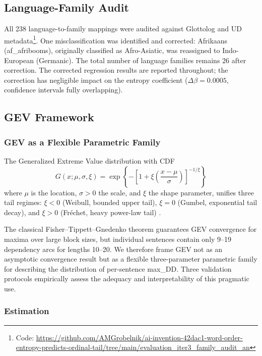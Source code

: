 \documentclass[11pt,letterpaper]{article}
\begin{document}
\subsection{Language-Family Audit}

All 238 language-to-family mappings were audited against Glottolog \cite{Hammarstrom2024} and UD metadata\footnote{Code: \url{https://github.com/AMGrobelnik/ai-invention-42dac1-word-order-entropy-predicts-ordinal-tail/tree/main/evaluation_iter3_family_audit_an}}. One misclassification was identified and corrected: Afrikaans (af\_afribooms), originally classified as Afro-Asiatic, was reassigned to Indo-European (Germanic). The total number of language families remains 26 after correction. The corrected regression results are reported throughout; the correction has negligible impact on the entropy coefficient ($\Delta\beta = 0.0005$, confidence intervals fully overlapping).

\subsection{GEV Framework}

\subsubsection{GEV as a Flexible Parametric Family}

The Generalized Extreme Value distribution with CDF
\begin{equation}\label{eq:gev}
G(x; \mu, \sigma, \xi) = \exp\left\{-\left[1 + \xi\left(\frac{x - \mu}{\sigma}\right)\right]^{-1/\xi}\right\}
\end{equation}
where $\mu$ is the location, $\sigma > 0$ the scale, and $\xi$ the shape parameter, unifies three tail regimes: $\xi < 0$ (Weibull, bounded upper tail), $\xi = 0$ (Gumbel, exponential tail decay), and $\xi > 0$ (Fr\'echet, heavy power-law tail) \cite{Coles2001}.

The classical Fisher--Tippett--Gnedenko theorem guarantees GEV convergence for maxima over large block sizes, but individual sentences contain only 9--19 dependency arcs for lengths 10--20. We therefore frame GEV not as an asymptotic convergence result but as a flexible three-parameter parametric family for describing the distribution of per-sentence max\_DD. Three validation protocols empirically assess the adequacy and interpretability of this pragmatic use.

\subsubsection{Estimation}
\end{document}
